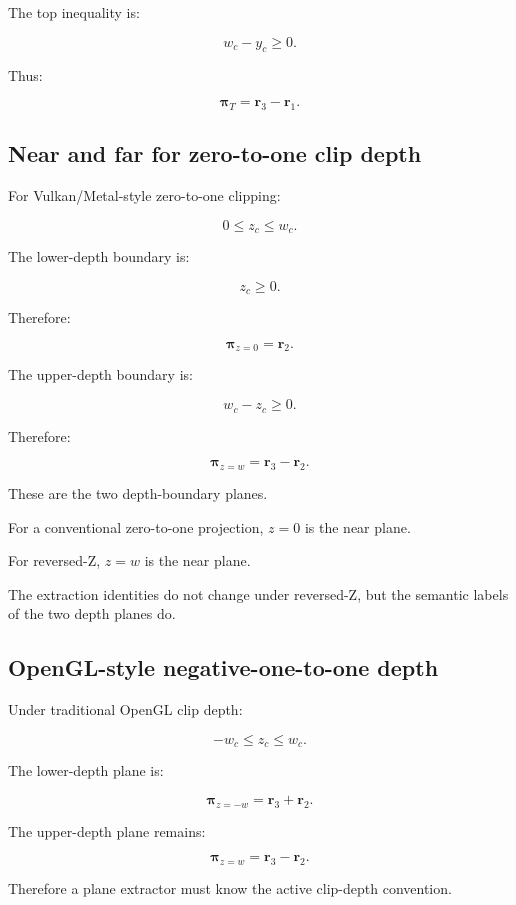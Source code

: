 The top inequality is:

\[
 w_c-y_c\ge0.
\]

Thus:

\[
 \boxed{ \boldsymbol\pi_T=\mathbf r_3-\mathbf r_1 }.
\]

\subsection{Near and far for zero-to-one clip depth}\label{02-foundations-ii-ch034-near-and-far-for-zero-to-one-clip-depth}

For Vulkan/Metal-style zero-to-one clipping:

\[
 0\le z_c\le w_c.
\]

The lower-depth boundary is:

\[
 z_c\ge0.
\]

Therefore:

\[
 \boxed{ \boldsymbol\pi_{z=0}=\mathbf r_2 }.
\]

The upper-depth boundary is:

\[
 w_c-z_c\ge0.
\]

Therefore:

\[
 \boxed{ \boldsymbol\pi_{z=w}=\mathbf r_3-\mathbf r_2 }.
\]

These are the two depth-boundary planes.

For a conventional zero-to-one projection, \(z=0\) is the near plane.

For reversed-Z, \(z=w\) is the near plane.

The extraction identities do not change under reversed-Z, but the semantic labels of the two depth planes do.

\subsection{OpenGL-style negative-one-to-one depth}\label{02-foundations-ii-ch034-opengl-style-negative-one-to-one-depth}

Under traditional OpenGL clip depth:

\[
 -w_c\le z_c\le w_c.
\]

The lower-depth plane is:

\[
 \boxed{ \boldsymbol\pi_{z=-w}=\mathbf r_3+\mathbf r_2 }.
\]

The upper-depth plane remains:

\[
 \boxed{ \boldsymbol\pi_{z=w}=\mathbf r_3-\mathbf r_2 }.
\]

Therefore a plane extractor must know the active clip-depth convention.


